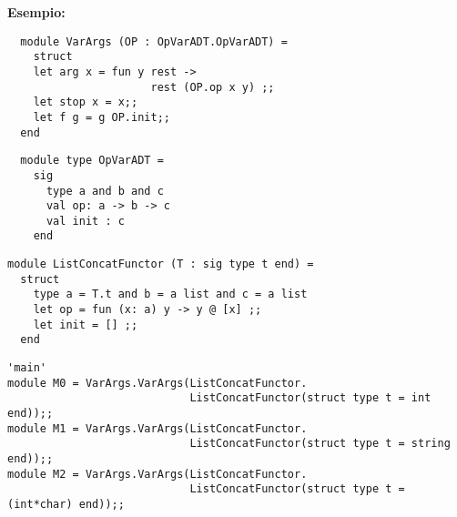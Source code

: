 \documentclass{article}
\begin{document}
\vspace*{0.5cm}

\hspace*{0.5cm}\textbf{Esempio:}

\vspace*{0.5cm}

\begin{minipage}{0.35\textwidth}
\begin{verbatim}
  module VarArgs (OP : OpVarADT.OpVarADT) =
    struct
    let arg x = fun y rest -> 
                      rest (OP.op x y) ;;
    let stop x = x;;
    let f g = g OP.init;;
  end
  \end{verbatim}
  \begin{verbatim}
  module type OpVarADT =
    sig
      type a and b and c
      val op: a -> b -> c
      val init : c
    end
  \end{verbatim}
\end{minipage}
\hfill
\begin{minipage}{0.6\textwidth}
\begin{verbatim}
module ListConcatFunctor (T : sig type t end) = 
  struct
    type a = T.t and b = a list and c = a list
    let op = fun (x: a) y -> y @ [x] ;;
    let init = [] ;;
  end
\end{verbatim}
\begin{verbatim}
'main'
module M0 = VarArgs.VarArgs(ListConcatFunctor.
                            ListConcatFunctor(struct type t = int end));;
module M1 = VarArgs.VarArgs(ListConcatFunctor.
                            ListConcatFunctor(struct type t = string end));;
module M2 = VarArgs.VarArgs(ListConcatFunctor.
                            ListConcatFunctor(struct type t = (int*char) end));;
\end{verbatim}

\end{minipage}
\end{document}
